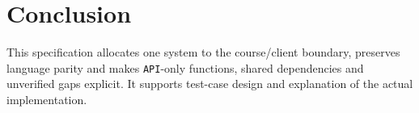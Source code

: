 \clearpage
\section{Conclusion}\label{sec:srs-26}
This specification allocates one system to the course/\allowbreak{}client boundary, preserves language parity and makes \texttt{API}-only functions, shared dependencies and unverified gaps explicit. It supports test-case design and explanation of the actual implementation.
